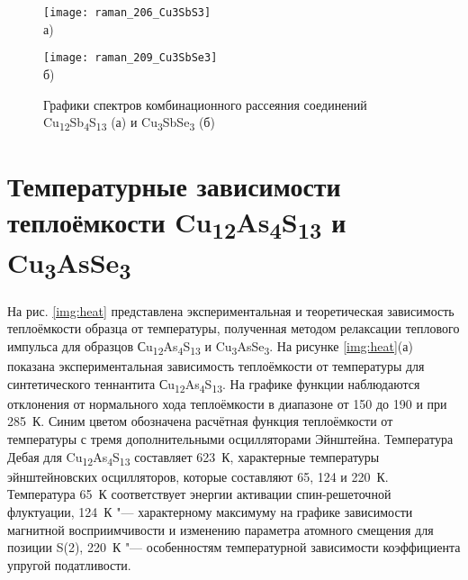 \begin{figure}[p!]
  \begin{minipage}[ht]{0.9\linewidth}\centering
    \texttt{[image: raman\_206\_Cu3SbS3]} \\ а)
  \end{minipage}
  \vfill
  \begin{minipage}[ht]{0.9\linewidth}\centering
    \texttt{[image: raman\_209\_Cu3SbSe3]} \\ б)
  \end{minipage}

      \caption[Графики спектров комбинационного рассеяния соединений Cu\textsubscript{12}Sb\textsubscript{4}S\textsubscript{13} (а) и Cu\textsubscript{3}SbSe\textsubscript{3} (б)]{Графики спектров комбинационного рассеяния соединений Cu\textsubscript{12}Sb\textsubscript{4}S\textsubscript{13} (а) и Cu\textsubscript{3}SbSe\textsubscript{3} (б)}
    \label{img:raman2}
\end{figure}


\newpage

\section{Температурные зависимости теплоёмкости Cu\textsubscript{12}As\textsubscript{4}S\textsubscript{13} и Cu\textsubscript{3}AsSe\textsubscript{3}} \label{sect4_4}

На рис. \ref{img:heat} представлена экспериментальная и теоретическая зависимость теплоёмкости  образца от температуры, полученная методом релаксации теплового импульса для образцов Сu\textsubscript{12}As\textsubscript{4}S\textsubscript{13} и Cu\textsubscript{3}AsSe\textsubscript{3}.
На рисунке \ref{img:heat}(а) показана экспериментальная зависимость теплоёмкости от температуры для синтетического теннантита Сu\textsubscript{12}As\textsubscript{4}S\textsubscript{13}. На графике функции наблюдаются отклонения от нормального хода теплоёмкости в диапазоне от 150 до 190 и при 285~К. Синим цветом обозначена расчётная функция теплоёмкости от температуры с тремя дополнительными осцилляторами Эйнштейна. Температура Дебая для Cu\textsubscript{12}As\textsubscript{4}S\textsubscript{13} составляет 623~К, характерные температуры эйнштейновских осцилляторов, которые составляют 65, 124 и 220~К. Температура 65~К соответствует энергии активации спин-решеточной флуктуации\cite{Gainov2008,Gainov_2006}, 124~К "--- характерному максимуму на графике зависимости магнитной восприимчивости и изменению параметра атомного смещения для позиции S(2), 220~К "--- особенностям температурной зависимости коэффициента упругой податливости\cite{bab_81}.

